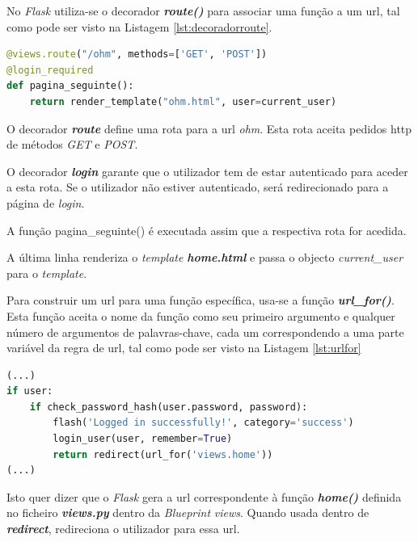 No \textit{Flask} utiliza-se o decorador \textit{\textbf{route()}} para associar uma função a um \acrshort{url}, tal como pode ser visto na Listagem \ref{lst:decoradorroute}.

\begin{minipage}{0.9\linewidth}
	\begin{lstlisting}[language=Python, caption=Decorador \textit{route()} - \textit{views.py}, label=lst:decoradorroute]
@views.route("/ohm", methods=['GET', 'POST'])
@login_required
def pagina_seguinte():
    return render_template("ohm.html", user=current_user)
\end{lstlisting}
\end{minipage}

O decorador \textit{\textbf{route}} define uma rota para a \acrshort{url} \textit{ohm}. Esta rota aceita pedidos \acrshort{http} de métodos \textit{GET} e \textit{POST}.

O decorador \textit{\textbf{login}} garante que o utilizador tem de estar autenticado para aceder a esta rota. Se o utilizador não estiver autenticado, será redirecionado para a página de \textit{login}.

A função pagina\_seguinte() é executada assim que a respectiva rota for acedida.

A última linha renderiza o \textit{template} \textit{\textbf{home.html}} e passa o objecto \textit{current\_user} para o \textit{template}.

Para construir um \acrshort{url} para uma função específica, usa-se a função \textit{\textbf{url\_for()}}. Esta função aceita o nome da função como seu primeiro argumento e qualquer número de argumentos de palavras-chave, cada um correspondendo a uma parte variável da regra de \acrshort{url}, tal como pode ser visto na Listagem \ref{lst:urlfor}

\begin{minipage}{0.9\linewidth}
	\begin{lstlisting}[language=Python, caption=Contrução de \textit{url}s - \textit{auth.py}, label=lst:urlfor]
(...)
if user:
    if check_password_hash(user.password, password):
        flash('Logged in successfully!', category='success')
        login_user(user, remember=True)
        return redirect(url_for('views.home'))
(...)
\end{lstlisting}
\end{minipage}

Isto quer dizer que o \textit{Flask} gera a \acrshort{url} correspondente à função \textit{\textbf{home()}} definida no ficheiro \textit{\textbf{views.py}} dentro da \textit{Blueprint} \textit{views}. Quando usada dentro de \textit{\textbf{redirect}}, redireciona o utilizador para essa \acrshort{url}.

